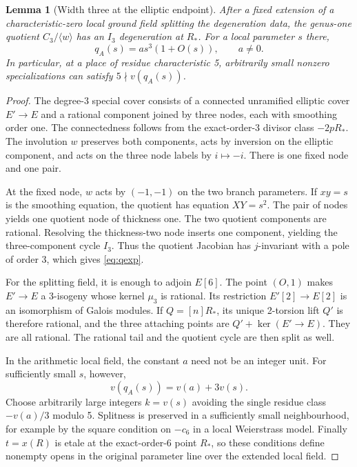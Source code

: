 \documentclass[11pt,a4paper]{article}
\newtheorem{lemma}[theorem]{Lemma}
\theoremstyle{definition}\newtheorem{definition}[theorem]{Definition}
\theoremstyle{remark}\newtheorem*{remark}{Remark}
\begin{document}
\begin{lemma}[Width three at the elliptic endpoint]\label{lem:width}
After a fixed extension of a characteristic-zero local ground field
splitting the degeneration data, the genus-one quotient
$C_3/\langle w\rangle$ has an $I_3$ degeneration at $R_*$. For a local
parameter $s$ there,
\begin{equation}\label{eq:qexp}
 q_{A}(s)=a s^3(1+O(s)),\qquad a\ne0.
\end{equation}
In particular, at a place of residue characteristic 5, arbitrarily small
nonzero specializations can satisfy $5\nmid v(q_A(s))$.
\end{lemma}
\begin{proof}
The degree-3 special cover consists of a connected unramified elliptic cover
$E'\to E$ and a rational component joined by three nodes, each with
smoothing order one. The connectedness follows from the exact-order-3
divisor class $-2pR_*$. The involution $w$ preserves both components,
acts by inversion on the elliptic component, and acts on the three node
labels by $i\mapsto-i$. There is one fixed node and one pair.

At the fixed node, $w$ acts by $(-1,-1)$ on the two branch parameters.
If $xy=s$ is the smoothing equation, the quotient has equation
$XY=s^2$. The pair of nodes yields one quotient node of thickness one.
The two quotient components are rational. Resolving the thickness-two
node inserts one component, yielding the three-component cycle $I_3$.
Thus the quotient Jacobian has $j$-invariant with a pole of order 3,
which gives \eqref{eq:qexp}.

For the splitting field, it is enough to adjoin $E[6]$. The point
$(O,1)$ makes $E'\to E$ a 3-isogeny whose kernel $\mu_3$ is rational.
Its restriction $E'[2]\to E[2]$ is an isomorphism of Galois modules.
If $Q=[n]R_*$, its unique 2-torsion lift $Q'$ is therefore rational,
and the three attaching points are $Q'+\ker(E'\to E)$.
They are all rational. The rational tail and the quotient cycle are
then split as well.

In the arithmetic local field, the constant $a$ need not be an integer
unit. For sufficiently small $s$, however,
\[
 v(q_A(s))=v(a)+3v(s).
\]
Choose arbitrarily large integers $k=v(s)$ avoiding the single residue
class $-v(a)/3$ modulo 5. Splitness is preserved in a sufficiently small
neighbourhood, for example by the square condition on $-c_6$ in a local
Weierstrass model. Finally $t=x(R)$ is etale at the exact-order-6 point
$R_*$, so these conditions define nonempty opens in the original
parameter line over the extended local field.
\end{proof}
\end{document}
